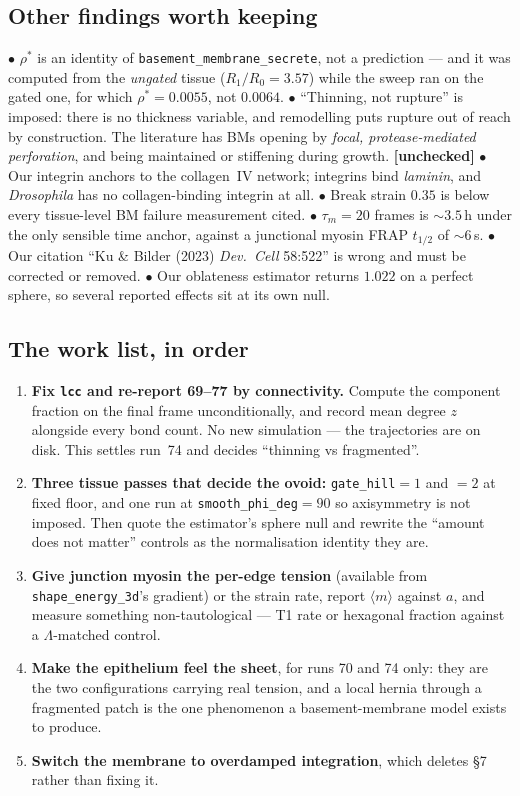 \documentclass[10pt]{article}
\newcommand{\op}[1]{\texttt{#1}}
\begin{document}
\subsection*{Other findings worth keeping}
$\bullet$ $\rho^\ast$ is an identity of \op{basement\_membrane\_secrete}, not a prediction --- and it was
computed from the \emph{ungated} tissue ($R_1/R_0=3.57$) while the sweep ran on the gated one, for which
$\rho^\ast=0.0055$, not $0.0064$. $\bullet$ ``Thinning, not rupture'' is imposed: there is no thickness
variable, and remodelling puts rupture out of reach by construction. The literature has BMs opening by
\emph{focal, protease-mediated perforation}, and being maintained or stiffening during growth.
\textbf{[unchecked]} $\bullet$ Our integrin anchors to the collagen~IV network; integrins bind
\emph{laminin}, and \emph{Drosophila} has no collagen-binding integrin at all. $\bullet$ Break strain
$0.35$ is below every tissue-level BM failure measurement cited. $\bullet$ $\tau_m=20$ frames is
$\sim\!3.5$\,h under the only sensible time anchor, against a junctional myosin FRAP $t_{1/2}$ of
$\sim\!6$\,s. $\bullet$ Our citation ``Ku \& Bilder (2023) \emph{Dev.\ Cell} 58:522'' is wrong and must
be corrected or removed. $\bullet$ Our oblateness estimator returns $1.022$ on a perfect sphere, so
several reported effects sit at its own null.

\subsection*{The work list, in order}
\begin{enumerate}\itemsep2pt
\item \textbf{Fix \op{lcc} and re-report 69--77 by connectivity.} Compute the component fraction on the
final frame unconditionally, and record mean degree $z$ alongside every bond count. No new simulation
--- the trajectories are on disk. This settles run~74 and decides ``thinning vs fragmented''.
\item \textbf{Three tissue passes that decide the ovoid:} \op{gate\_hill}$=1$ and $=2$ at fixed floor,
and one run at \op{smooth\_phi\_deg}$=90$ so axisymmetry is not imposed. Then quote the estimator's
sphere null and rewrite the ``amount does not matter'' controls as the normalisation identity they are.
\item \textbf{Give junction myosin the per-edge tension} (available from \op{shape\_energy\_3d}'s
gradient) or the strain rate, report $\langle m\rangle$ against $a$, and measure something
non-tautological --- T1 rate or hexagonal fraction against a $\Lambda$-matched control.
\item \textbf{Make the epithelium feel the sheet}, for runs 70 and 74 only: they are the two
configurations carrying real tension, and a local hernia through a fragmented patch is the one
phenomenon a basement-membrane model exists to produce.
\item \textbf{Switch the membrane to overdamped integration}, which deletes \S7 rather than fixing it.
\end{enumerate}
\end{document}
